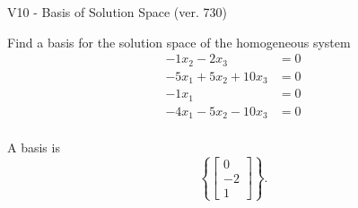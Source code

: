 \begin{exercise}
  \begin{exerciseTitle}V10 - Basis of Solution Space (ver. 730)\end{exerciseTitle}
  \begin{exerciseStatement}
    Find a basis for the solution space of the homogeneous system 
\begin{align*}
 -1 x_ 2 -2 x_ 3 &= 0  \\ 
  -5 x_ 1 + 5 x_ 2 + 10 x_ 3 &= 0  \\ 
  -1 x_ 1 &= 0  \\ 
  -4 x_ 1 -5 x_ 2 -10 x_ 3 &= 0  \\ 
 \end{align*}


 
  \end{exerciseStatement}

  \begin{exerciseAnswer}
   A basis is   
\[\left\{\left[\begin{array}{c}
0 \\
-2 \\
1
\end{array}\right]\right\}.\]

  


  \end{exerciseAnswer}
\end{exercise}